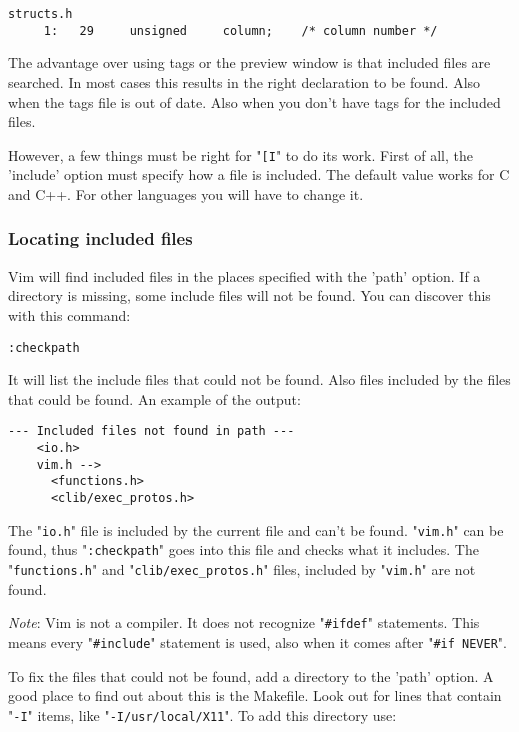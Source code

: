 \begin{Verbatim}[samepage=true]
    structs.h 
     1:   29     unsigned     column;    /* column number */ 
\end{Verbatim}

The advantage over using tags or the preview window is that included files are searched.
In most cases this results in the right declaration to be found.
Also when the tags file is out of date.
Also when you don't have tags for the included files.

However, a few things must be right for "\verb![I!" to do its work.
First of all, the 'include' option must specify how a file is included.
The default value works for C and C++.
For other languages you will have to change it.
\subsubsection{Locating included files}
Vim will find included files in the places specified with the 'path' option.
If a directory is missing, some include files will not be found.
You can discover this with this command:

\begin{Verbatim}[samepage=true]
 :checkpath
\end{Verbatim}

It will list the include files that could not be found.
Also files included by the files that could be found.
An example of the output:

\begin{Verbatim}[samepage=true]
    --- Included files not found in path --- 
    <io.h> 
    vim.h --> 
      <functions.h> 
      <clib/exec_protos.h> 
\end{Verbatim}

The "\verb!io.h!" file is included by the current file and can't be found.
"\verb!vim.h!" can be found, thus "\verb!:checkpath!" goes into this file and checks what it includes.
The "\verb!functions.h!" and "\verb!clib/exec_protos.h!" files, included by "\verb!vim.h!" are not found.

\emph{Note}:
Vim is not a compiler.
It does not recognize "\verb!#ifdef!" statements.
This means every "\verb!#include!" statement is used, also when it comes after "\verb!#if NEVER!".

To fix the files that could not be found, add a directory to the 'path' option.
A good place to find out about this is the Makefile.
Look out for lines that contain "\verb!-I!" items, like "\verb!-I/usr/local/X11!".
To add this directory use:

